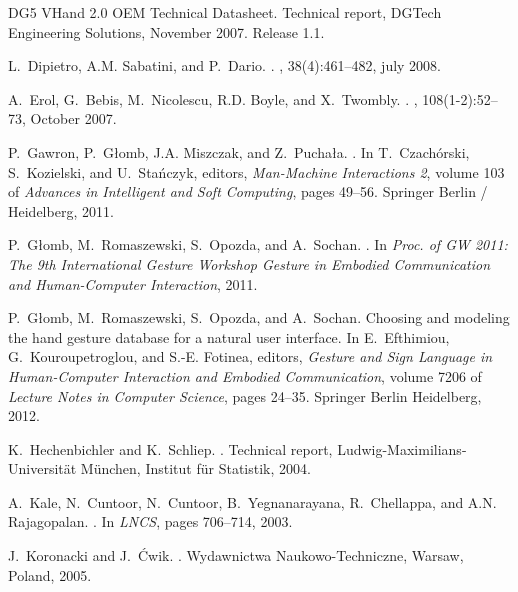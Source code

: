\documentclass[]{article}
\begin{document}
\begin{thebibliography}{10}
{DG5 VHand 2.0 OEM Technical Datasheet}.
\newblock Technical report, DGTech Engineering Solutions, November 2007.
\newblock Release 1.1.

L.~Dipietro, A.M. Sabatini, and P.~Dario.
.
, 38(4):461--482, july 2008.

A.~Erol, G.~Bebis, M.~Nicolescu, R.D. Boyle, and X.~Twombly.
.
, 108(1-2):52--73, October 2007.

P.~Gawron, P.~G{\l}omb, J.A. Miszczak, and Z.~Pucha{\l}a.
.
\newblock In T.~Czach{\'o}rski, S.~Kozielski, and U.~Sta{\'n}czyk, editors,
  {\em {Man-Machine Interactions 2}}, volume 103 of {\em {Advances in
  Intelligent and Soft Computing}}, pages 49--56. Springer Berlin / Heidelberg,
  2011.

P.~G{\l}omb, M.~Romaszewski, S.~Opozda, and A.~Sochan.
.
\newblock In {\em {Proc. of GW 2011: The 9th International Gesture Workshop
  Gesture in Embodied Communication and Human-Computer Interaction}}, 2011.

P.~G\l{}omb, M.~Romaszewski, S.~Opozda, and A.~Sochan.
\newblock Choosing and modeling the hand gesture database for a natural user
  interface.
\newblock In E.~Efthimiou, G.~Kouroupetroglou, and S.-E. Fotinea, editors, {\em
  Gesture and Sign Language in Human-Computer Interaction and Embodied
  Communication}, volume 7206 of {\em Lecture Notes in Computer Science}, pages
  24--35. Springer Berlin Heidelberg, 2012.

K.~Hechenbichler and K.~Schliep.
.
\newblock Technical report, Ludwig-Maximilians-Universit\"at M\"unchen,
  Institut f\"ur Statistik, 2004.

A.~Kale, N.~Cuntoor, N.~Cuntoor, B.~Yegnanarayana, R.~Chellappa, and A.N.
  Rajagopalan.
.
\newblock In {\em {LNCS}}, pages 706--714, 2003.

J.~Koronacki and J.~{\'C}wik.
.
\newblock Wydawnictwa Naukowo-Techniczne, Warsaw, Poland, 2005.


\end{thebibliography}
\end{document}
